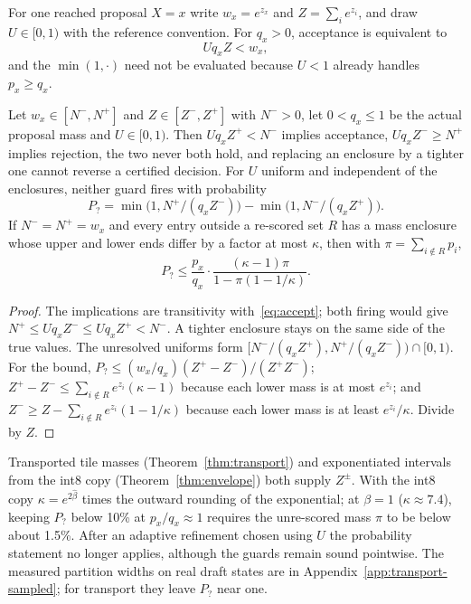For one reached proposal $X=x$ write $w_x=e^{z_x}$ and $Z=\sum_ie^{z_i}$, and draw $U\in[0,1)$ with the reference convention. For $q_x>0$, acceptance is equivalent to
\begin{equation}Uq_xZ<w_x,\label{eq:accept}\end{equation}
and the $\min(1,\cdot)$ need not be evaluated because $U<1$ already handles $p_x\ge q_x$.

\begin{theorem}\label{thm:guards}\label{thm:guard}
Let $w_x\in[N^-,N^+]$ and $Z\in[Z^-,Z^+]$ with $N^->0$, let $0<q_x\le1$ be the actual proposal mass and $U\in[0,1)$. Then $Uq_xZ^+<N^-$ implies acceptance, $Uq_xZ^-\ge N^+$ implies rejection, the two never both hold, and replacing an enclosure by a tighter one cannot reverse a certified decision. For $U$ uniform and independent of the enclosures, neither guard fires with probability
\[P_?=\min\bigl(1,N^+/(q_xZ^-)\bigr)-\min\bigl(1,N^-/(q_xZ^+)\bigr).\]
If $N^-=N^+=w_x$ and every entry outside a re-scored set $R$ has a mass enclosure whose upper and lower ends differ by a factor at most $\kappa$, then with $\pi=\sum_{i\notin R}p_i$,
\[P_?\le\frac{p_x}{q_x}\cdot\frac{(\kappa-1)\pi}{1-\pi(1-1/\kappa)}.\]
\end{theorem}
\begin{proof}
The implications are transitivity with~\eqref{eq:accept}; both firing would give $N^+\le Uq_xZ^-\le Uq_xZ^+<N^-$. A tighter enclosure stays on the same side of the true values. The unresolved uniforms form $[N^-/(q_xZ^+),N^+/(q_xZ^-))\cap[0,1)$. For the bound, $P_?\le(w_x/q_x)(Z^+-Z^-)/(Z^+Z^-)$; $Z^+-Z^-\le\sum_{i\notin R}e^{z_i}(\kappa-1)$ because each lower mass is at most $e^{z_i}$; and $Z^-\ge Z-\sum_{i\notin R}e^{z_i}(1-1/\kappa)$ because each lower mass is at least $e^{z_i}/\kappa$. Divide by $Z$.
\end{proof}
Transported tile masses (Theorem~\ref{thm:transport}) and exponentiated intervals from the int8 copy (Theorem~\ref{thm:envelope}) both supply $Z^\pm$. With the int8 copy $\kappa=e^{2\hat\beta}$ times the outward rounding of the exponential; at $\beta=1$ ($\kappa\approx7.4$), keeping $P_?$ below 10\% at $p_x/q_x\approx1$ requires the unre-scored mass $\pi$ to be below about 1.5\%. After an adaptive refinement chosen using $U$ the probability statement no longer applies, although the guards remain sound pointwise. The measured partition widths on real draft states are in Appendix~\ref{app:transport-sampled}; for transport they leave $P_?$ near one.

